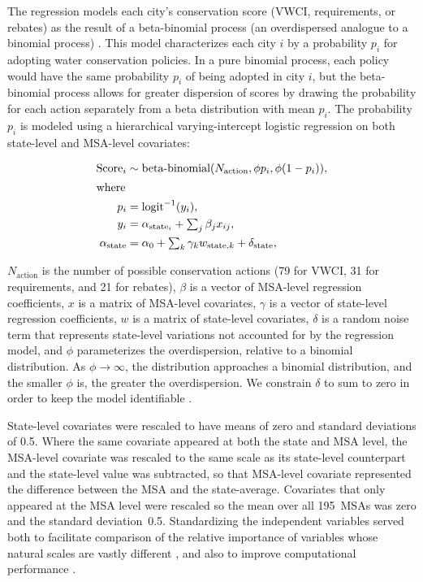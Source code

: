 \documentclass[draft,linenumbers]{agujournal}\usepackage{knitr}
\begin{document}
The regression models each city's conservation score (VWCI, requirements, or rebates) as the result of a beta-binomial process (an overdispersed analogue to a binomial process) \citep[pp.~437--38]{gelman_bda_2014}.
This model characterizes each city $i$ by a probability $p_i$ for adopting water conservation policies. In a pure binomial process, each policy would have the same probability $p_i$ of being adopted in city $i$, but the beta-binomial process allows for greater dispersion of scores by drawing the probability for each action separately from a beta distribution with mean $p_i$.
The probability $p_i$ is modeled using a hierarchical varying-intercept logistic regression on both state-level and MSA-level covariates:
\begin{linenomath*}
\begin{align}
\text{Score}_i \sim{}& \text{beta-binomial}(N_{\text{action}}, \phi p_i, \phi (1 - p_i)), \\
\intertext{where}
p_i ={}& \text{logit}^{-1}(y_i),\\
y_i ={}& \alpha_{\text{state}_i} + \textstyle\sum_j \beta_j x_{ij},\\
\alpha_{\text{state}} ={}&
\alpha_0  + \textstyle\sum_k \gamma_k w_{\text{state}, k} + \delta_{\text{state}},
\end{align}
\end{linenomath*}
$N_{\text{action}}$ is the number of possible conservation actions (79 for VWCI, 31 for requirements, and 21 for rebates),
$\beta$ is a vector of MSA-level regression coefficients,
$x$ is a matrix of MSA-level covariates,
$\gamma$ is a vector of state-level regression coefficients,
$w$ is a matrix of state-level covariates,
$\delta$ is a random noise term that represents state-level variations not accounted for by the regression model,
and $\phi$ parameterizes the overdispersion, relative to a binomial distribution. As $\phi \rightarrow \infty$, the distribution approaches a binomial distribution, and the smaller $\phi$ is, the greater the overdispersion. We constrain $\delta$ to sum to zero in order to keep the model identifiable \citep[Ch.~23]{stan_manual_2015}.

State-level covariates were rescaled to have means of zero and standard deviations of 0.5.
Where the same covariate appeared at both the state and MSA level, the MSA-level covariate was rescaled to the same scale as its state-level counterpart and the state-level value was subtracted, so that MSA-level covariate represented the difference between the MSA and the state-average.
Covariates that only appeared at the MSA level were rescaled so the mean over all 195~MSAs was zero and the standard deviation~0.5.
Standardizing the independent variables served both to facilitate comparison of the relative importance of variables whose natural scales are vastly different \citep[pp.~55--57]{gelman_prior_2008,gelman_arm_2007}, and also to improve computational performance \citep{stan_manual_2015}.
\end{document}
